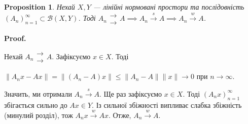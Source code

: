 \documentclass[a4paper, 10pt]{article}
\makeatletter
\theoremstyle{theoremdd}
\theoremstyle{theoremdd}
\theoremstyle{theoremdd}
\theoremstyle{theoremdd}
\theoremstyle{theoremdd}
\newtheorem{proposition}[theorem]{Proposition}
\theoremstyle{theoremdd}
\theoremstyle{theoremdd}
\theoremstyle{theoremdd}
\newcommand{\toweak}{\overset{w}{\to}}
\newcommand{\tostrong}{\overset{s}{\to}}
\renewenvironment{proof}[1][Proof.\\]{\par
\pushQED{\hfill \qed}%
\normalfont \topsep6\p@\@plus6\p@\relax
\trivlist
\item\relax
{\bfseries
#1\@addpunct{.}}\hspace\labelsep\ignorespaces
}{%
\popQED\endtrivlist\@endpefalse
}
\makeatother
\begin{document}
\begin{proposition}
Нехай $X,Y$ --- лінійні нормовані простори та послідовність $(A_n)_{n=1}^\infty \subset \mathcal{B}(X,Y)$. Тоді $A_n \substack{\to \\ \to} A \implies A_n \tostrong A \implies A_n \toweak A$.
\end{proposition}

\begin{proof}
Нехай $A_n \substack{\to \\ \to} A$. Зафіксуємо $x \in X$. Тоді
\begin{center}
$\| A_n x - Ax \| = \| (A_n-A) x\| \leq \|A_n - A\| \|x\| \to 0$ при $n \to \infty$.
\end{center}
Значить, ми отримали $A_n \tostrong A$. Ще раз зафіксуємо $x \in X$. Тоді $(A_n x)_{n=1}^\infty$ збігається сильно до $Ax \in Y$. Із сильної збіжності випливає слабка збіжність (минулий розділ), тож $A_n x\toweak A x$. Отже, $A_n \toweak A$.
\end{proof}
\end{document}

